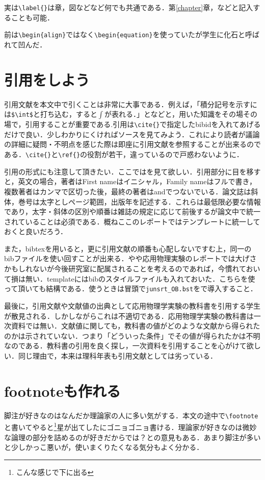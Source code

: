 \documentclass[12 pt,a4paper,autodetect-engine]{jsarticle}
\begin{document}
実は\verb|\label{}|は章，図などなど何でも共通である．第\ref{chapter}章，などと記入することも可能．

前は\verb|\begin{align}|ではなく\verb|\begin{equation}|を使っていたが学生に化石と呼ばれて凹んだ．

\section{引用をしよう}
引用文献を本文中で引くことは非常に大事である．例えば，「積分記号を示すには\verb|$\int$|と打ち込む，すると$\int$が表れる\cite{美文書}．」となどと，用いた知識をその場その場で，引用することが重要である.引用は\verb|\cite{}|で指定したbibidを入れてあげるだけで良い．少しわかりにくければソースを見てみよう．これにより読者が議論の詳細に疑問・不明点を感じた際は即座に引用文献を参照することが出来るのである．\verb|\cite{}|と\verb|\ref{}|の役割が若干，違っているので戸惑わないように．

引用の形式にも注意して頂きたい．ここでは\cite{example}を見て欲しい．引用部分に目を移すと，英文の場合，著者はFirst nameはイニシャル，Family nameはフルで書き，複数著者はカンマで区切った後，最終の著者はandでつないでいる．論文誌は斜体，巻号は太字としページ範囲，出版年を記述する．これらは最低限必要な情報であり，太字・斜体の区別や順番は雑誌の規定に応じて前後するが論文中で統一されていることは必須である．概ねここのレポートではテンプレートに統一しておくと良いだろう．

また，bibtexを用いると，更に引用文献の順番も心配しないですむ上，同一のbibファイルを使い回すことが出来る．やや応用物理実験のレポートでは大げさかもしれないが今後研究室に配属されることを考えるのであれば，今慣れておいて損は無い．templateにはbibのスタイルファイルも入れておいた．こちらを使って頂いても結構である．使うときは冒頭で\verb|junsrt_OB.bst|を\verb||で導入すること．

最後に，引用文献や文献値の出典として応用物理学実験の教科書を引用する学生が散見される．しかしながらこれは不適切である．応用物理学実験の教科書は一次資料では無い．文献値に関しても，教科書の値がどのような文献から得られたのかは示されていない．つまり「どういった条件」でその値が得られたかは不明なのである．教科書の引用を良く探し，一次資料を引用することを心がけて欲しい．同じ理由で，本来は理科年表も引用文献としては劣っている．

\section{footnoteも作れる}
脚注が好きなのはなんだか理論家の人に多い気がする．本文の途中で\verb|\footnote|と書いてやると\footnote{こんな感じで下に出る}星が出てしたにゴニョゴニョ書ける．理論家が好きなのは微妙な論理の部分を詰めるのが好きだからでは？との意見もある．あまり脚注が多いと少しかっこ悪いが，使いまくりたくなる気分もよく分かる．
\end{document}
